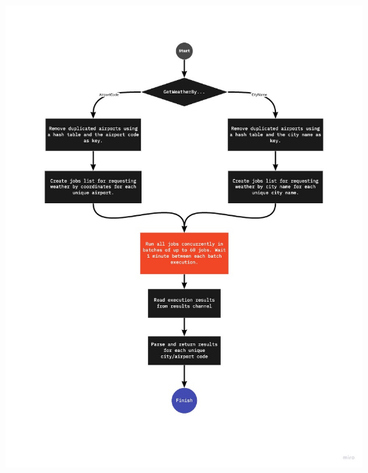\documentclass[10pt, letterpaper]{article}
\begin{document}
\begin{center}
  \includegraphics[scale=0.5]{flow-chart-2.jpg}
\end{center}
\clearpage
\end{document}

